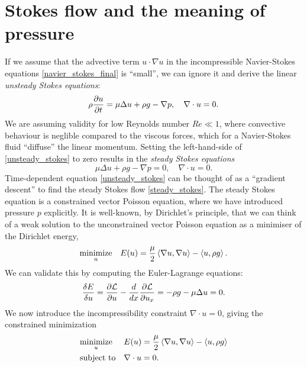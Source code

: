 \section{Stokes flow and the meaning of pressure}\label{pressure_derivation}
If we assume that the advective term $u\cdot \nabla u$ in the incompressible Navier-Stokes equations \eqref{navier_stokes_final} is ``small'',
we can ignore it and derive the linear \textit{unsteady Stokes equations}:
\begin{equation}\label{unsteady_stokes}
    \rho\frac{\partial u}{\partial t} = \mu\Delta u + \rho g - \nabla p, \quad \nabla\cdot u = 0.
\end{equation}
We are assuming validity for low Reynolds number $Re \ll 1$, where convective behaviour is neglible compared to the viscous forces, which for a
Navier-Stokes fluid ``diffuse'' the linear momentum. Setting the left-hand-side of \eqref{unsteady_stokes} to zero results in the \textit{steady Stokes equations}
\begin{equation}\label{steady_stokes}
    \mu\Delta u + \rho g - \nabla p = 0,\quad \nabla\cdot u = 0.
\end{equation}
Time-dependent equation \eqref{unsteady_stokes} can be thought of as a ``gradient descent'' to find the steady Stokes flow \eqref{steady_stokes}.
The steady Stokes equation is a constrained vector Poisson equation, where we have introduced pressure $p$ explicitly.
It is well-known, by Dirichlet's principle, that we can think
of a weak solution to the unconstrained vector Poisson equation as a minimiser of the Dirichlet energy,
\begin{equation}
\begin{aligned}
& \underset{u}{\text{minimize}}
& & E(u) =  \frac{\mu}{2} \left<\nabla u, \nabla u\right> - \left<u, \rho g\right>.\\
\end{aligned}
\end{equation}
\newcommand{\energygradient}{\frac{\delta E}{\delta u}}
We can validate this by computing the Euler-Lagrange equations:
\begin{align*}
    \frac{\delta E}{\delta u} = \frac{\partial \mathcal{L}}{\partial u} - \frac{d}{dx}\frac{\partial \mathcal{L}}{\partial u_x}
                              = -\rho g - \mu\Delta u = 0.
\end{align*}
We now introduce the incompressibility constraint $\nabla \cdot u = 0$, giving the constrained minimization
\begin{equation}\label{stokes_flow_optimization}
\begin{aligned}
& \underset{u}{\text{minimize}}
& & E(u) =  \frac{\mu}{2} \left<\nabla u, \nabla u\right> - \left<u, \rho g\right>\\
& \text{subject to}
& & \nabla\cdot u = 0.
\end{aligned}
\end{equation}

